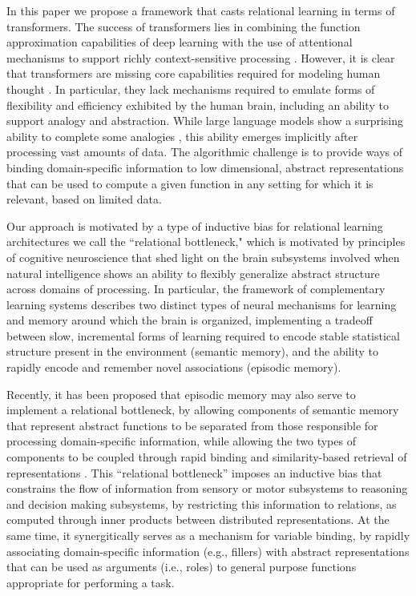 In this paper we propose a framework that casts relational learning in terms of transformers. 
The success of transformers lies in combining the function approximation capabilities of deep learning with the use
of attentional mechanisms to support richly context-sensitive processing \citep{transformers,vaswani2017attention,
    kerg2020untangling}. However, it is clear that transformers are missing core capabilities required for modeling
human thought \citep{mahowald2023dissociating}.  In particular, they lack mechanisms required to emulate forms of
flexibility and efficiency exhibited by the human brain, including an ability to support analogy and abstraction.
While large language models show a surprising ability to complete some analogies \citep{webb}, this ability
emerges implicitly after processing vast amounts of data. The algorithmic challenge is to provide ways of binding
domain-specific information to low dimensional, abstract representations that can be used to compute a given function
in any setting for which it is relevant, based on limited data.

Our approach is motivated by a type of inductive bias for relational learning architectures we call the
``relational bottleneck," which is motivated by principles of cognitive neuroscience that shed light on the brain
subsystems involved when natural intelligence shows an ability to flexibly generalize abstract structure across
domains of processing. In particular, the framework of complementary learning systems \citep{McClelland:1995,
    Kumaran:2016} describes two distinct types of neural mechanisms for learning and memory around which the brain
is organized, implementing a tradeoff between slow, incremental forms of learning required to encode stable statistical
structure present in the environment (semantic memory), and the ability to rapidly encode and remember novel
associations (episodic memory).

Recently, it has been proposed that episodic memory may also serve to implement a relational bottleneck,
by allowing components of semantic memory that represent abstract functions to be separated from those
responsible for processing domain-specific information, while allowing the two types of components to be coupled
through rapid binding and similarity-based retrieval of representations \citep{esbn}.
This ``relational bottleneck'' imposes an inductive bias that constrains the flow of information from sensory or
motor subsystems to reasoning and decision making subsystems, by restricting this information to relations, as
computed through inner products between distributed representations.
At the same time, it synergitically serves as a mechanism for variable binding, by rapidly associating domain-specific information (e.g., fillers) with abstract representations that can be used as arguments (i.e., roles)
to general purpose functions appropriate for performing a task.

